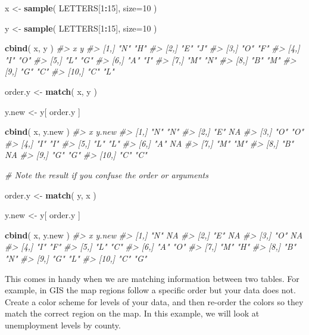 \documentclass[]{book}
\newenvironment{Shaded}{\begin{snugshade}}{\end{snugshade}}
\newcommand{\CommentTok}[1]{\textcolor[rgb]{0.56,0.35,0.01}{\textit{#1}}}
\newcommand{\DataTypeTok}[1]{\textcolor[rgb]{0.13,0.29,0.53}{#1}}
\newcommand{\DecValTok}[1]{\textcolor[rgb]{0.00,0.00,0.81}{#1}}
\newcommand{\KeywordTok}[1]{\textcolor[rgb]{0.13,0.29,0.53}{\textbf{#1}}}
\newcommand{\NormalTok}[1]{#1}
\newcommand{\OperatorTok}[1]{\textcolor[rgb]{0.81,0.36,0.00}{\textbf{#1}}}
\newcommand{\StringTok}[1]{\textcolor[rgb]{0.31,0.60,0.02}{#1}}
\theoremstyle{definition}
\theoremstyle{definition}
\theoremstyle{definition}
\theoremstyle{remark}
\begin{document}
\begin{Shaded}
\begin{Highlighting}[]

\NormalTok{x <-}\StringTok{ }\KeywordTok{sample}\NormalTok{( LETTERS[}\DecValTok{1}\OperatorTok{:}\DecValTok{15}\NormalTok{], }\DataTypeTok{size=}\DecValTok{10}\NormalTok{ )}

\NormalTok{y <-}\StringTok{ }\KeywordTok{sample}\NormalTok{( LETTERS[}\DecValTok{1}\OperatorTok{:}\DecValTok{15}\NormalTok{], }\DataTypeTok{size=}\DecValTok{10}\NormalTok{ )}

\KeywordTok{cbind}\NormalTok{( x, y )}
\CommentTok{#>       x   y  }
\CommentTok{#>  [1,] "N" "H"}
\CommentTok{#>  [2,] "E" "J"}
\CommentTok{#>  [3,] "O" "F"}
\CommentTok{#>  [4,] "I" "O"}
\CommentTok{#>  [5,] "L" "G"}
\CommentTok{#>  [6,] "A" "I"}
\CommentTok{#>  [7,] "M" "N"}
\CommentTok{#>  [8,] "B" "M"}
\CommentTok{#>  [9,] "G" "C"}
\CommentTok{#> [10,] "C" "L"}

\NormalTok{order.y <-}\StringTok{ }\KeywordTok{match}\NormalTok{( x, y )}

\NormalTok{y.new <-}\StringTok{ }\NormalTok{y[ order.y ]}

\KeywordTok{cbind}\NormalTok{( x, y.new )}
\CommentTok{#>       x   y.new}
\CommentTok{#>  [1,] "N" "N"  }
\CommentTok{#>  [2,] "E" NA   }
\CommentTok{#>  [3,] "O" "O"  }
\CommentTok{#>  [4,] "I" "I"  }
\CommentTok{#>  [5,] "L" "L"  }
\CommentTok{#>  [6,] "A" NA   }
\CommentTok{#>  [7,] "M" "M"  }
\CommentTok{#>  [8,] "B" NA   }
\CommentTok{#>  [9,] "G" "G"  }
\CommentTok{#> [10,] "C" "C"}


\CommentTok{# Note the result if you confuse the order or arguments}

\NormalTok{order.y <-}\StringTok{ }\KeywordTok{match}\NormalTok{( y, x )}

\NormalTok{y.new <-}\StringTok{ }\NormalTok{y[ order.y ]}

\KeywordTok{cbind}\NormalTok{( x, y.new )}
\CommentTok{#>       x   y.new}
\CommentTok{#>  [1,] "N" NA   }
\CommentTok{#>  [2,] "E" NA   }
\CommentTok{#>  [3,] "O" NA   }
\CommentTok{#>  [4,] "I" "F"  }
\CommentTok{#>  [5,] "L" "C"  }
\CommentTok{#>  [6,] "A" "O"  }
\CommentTok{#>  [7,] "M" "H"  }
\CommentTok{#>  [8,] "B" "N"  }
\CommentTok{#>  [9,] "G" "L"  }
\CommentTok{#> [10,] "C" "G"}
\end{Highlighting}
\end{Shaded}

This comes in handy when we are matching information between two tables.
For example, in GIS the map regions follow a specific order but your
data does not. Create a color scheme for levels of your data, and then
re-order the colors so they match the correct region on the map. In this
example, we will look at unemployment levels by county.
\end{document}
